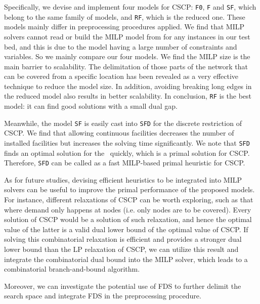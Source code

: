  Specifically, we devise and implement four models for CSCP:   \texttt{F0},  \texttt{F} and  \texttt{SF}, which belong to the same family of models, and \texttt{RF}, which is the reduced one. These models mainly differ in preprocessing procedures applied. We find that  MILP solvers cannot read or build  the MILP model from \cite{Hamacher20} for any instances in our test bed, and this is due to the model having a large number of constraints and variables. So we mainly compare our four models. We find the MILP size is the main barrier to scalability. The delimitation of those parts of the network that can be covered from a specific location has been revealed as a very effective technique to reduce the model size. In addition, avoiding breaking long edges in the reduced model also results in better scalability. In conclusion,
\texttt{RF} is the best model: it can find good solutions with a small dual gap.



Meanwhile, the model  \texttt{SF}  is easily cast into   \texttt{SFD} for the discrete restriction of CSCP. We find that allowing continuous facilities decreases the number of installed facilities but increases the solving time significantly.  We note that \texttt{SFD} finds an optimal solution for  the \dfproblem \, quickly, which is a primal solution for CSCP. Therefore, \texttt{SFD} can be called as a fast MILP-based primal heuristic for CSCP.


As for future studies, devising efficient heuristics to be integrated into MILP solvers can be useful to improve the primal performance of the proposed models. For instance, different relaxations of  CSCP can be worth exploring, such as that where demand only happens at nodes (i.e. only nodes are to be covered). Every solution of CSCP would be a solution of such relaxation, and hence the optimal value of the latter is a valid dual lower bound of the optimal value of  CSCP.  If solving this combinatorial relaxation is efficient and provides a stronger dual lower bound than the LP relaxation of CSCP, we can utilize this result and integrate the combinatorial dual bound into the MILP solver, which leads to a combinatorial branch-and-bound algorithm.



Moreover, we can investigate the potential use of FDS to further delimit the search space and integrate FDS in the preprocessing procedure.

